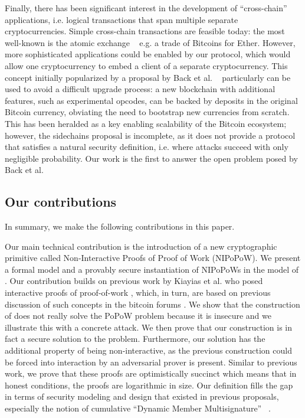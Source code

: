 Finally, there has been significant interest in the development of
``cross-chain'' applications, i.e. logical transactions that span multiple
separate cryptocurrencies. Simple cross-chain transactions are feasible today:
the most well-known is the atomic exchange ~\cite{tiernolan} e.g. a trade of
Bitcoins for Ether. However, more sophisticated applications could be enabled
by our protocol, which would allow one cryptocurrency to embed a client of a
separate cryptocurrency. This concept initially popularized by a proposal by
Back et al. ~\cite{sidechains} particularly can be used to avoid a difficult
upgrade process: a new blockchain with additional features, such as
experimental opcodes, can be backed by deposits in the original Bitcoin
currency, obviating the need to bootstrap new currencies from scratch. This
has been heralded as a key enabling scalability of the Bitcoin ecosystem;
however, the sidechains proposal is incomplete, as it does not provide a
protocol that satisfies a natural security definition, i.e. where attacks
succeed with only negligible probability. Our work is the first to answer the
open problem posed by Back et al.

\subsection{Our contributions}

In summary, we make the following contributions in this paper.

Our main technical contribution is the introduction of a new cryptographic
primitive called Non-Interactive Proofs of Proof of Work (NIPoPoW). We present a
formal model and a provably secure instantiation of NIPoPoWs in the model of
\cite{backbone}. Our contribution builds on previous work by Kiayias et al. who
posed interactive proofs of proof-of-work \cite{KLS}, which, in turn, are based
on previous discussion of such concepts in the bitcoin forums \cite{highway}.
We show that the construction of \cite{KLS} does not really solve the PoPoW
problem because it is insecure and we illustrate this with a concrete attack.
We then prove that our construction is in fact a secure solution to the problem.
Furthermore, our solution has the additional property of being non-interactive,
as the previous construction could be forced into interaction by an adversarial
prover is present. Similar to previous work, we prove that these proofs are
optimistically succinct which means that in honest conditions, the proofs are
logarithmic in size. Our definition fills the gap in terms of security modeling
and design that existed in previous proposals, especially the notion of
cumulative ``Dynamic Member Multisignature'' ~\cite{sidechains}.


